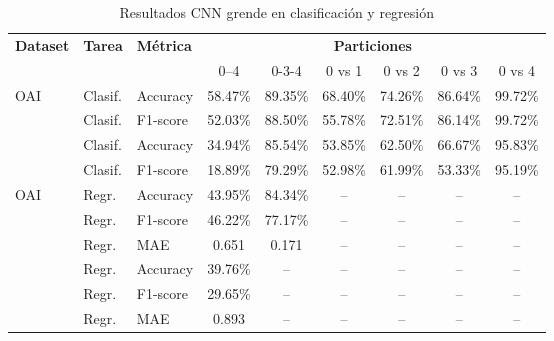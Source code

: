 \documentclass[11pt,spanish,listoffigures,listoftables]{tfgetsinf}
\begin{document}
\begin{table}[h]
    \centering
    \caption{Resultados CNN grende en clasificación y regresión}
    \label{tab:cnn_grande_results}
    \begin{tabular}{@{} l l l c c c c c c @{}} 
      \toprule
      \textbf{Dataset} & \textbf{Tarea} & \textbf{Métrica} 
        & \multicolumn{6}{c}{\textbf{Particiones}} \\
      \cmidrule(lr){4-9}
      & & & 0--4 & 0-3-4 & 0 vs 1 & 0 vs 2 & 0 vs 3 & 0 vs 4 \\
      \midrule
      \multirow{2}{*}{OAI}
        & Clasif. & Accuracy   & 58.47\% & 89.35\% & 68.40\% & 74.26\% & 86.64\% & 99.72\% \\
        & Clasif. & F1-score   & 52.03\% & 88.50\% & 55.78\% & 72.51\% & 86.14\% & 99.72\% \\
      \addlinespace
      \multirow{2}{*}{Gatos}
        & Clasif. & Accuracy   & 34.94\% & 85.54\% & 53.85\% & 62.50\% & 66.67\% & 95.83\% \\
        & Clasif. & F1-score   & 18.89\% & 79.29\% & 52.98\% & 61.99\% & 53.33\% & 95.19\% \\
      \midrule
      \multirow{3}{*}{OAI}
        & Regr.   & Accuracy   & 43.95\% & 84.34\% & -- & -- & -- & -- \\
        & Regr.   & F1-score   & 46.22\% & 77.17\% & -- & -- & -- & -- \\
        & Regr.   & MAE        & 0.651 & 0.171 & -- & -- & -- & -- \\
      \addlinespace
      \multirow{3}{*}{Gatos}
        & Regr.   & Accuracy   & 39.76\% & -- & -- & -- & -- & -- \\
        & Regr.   & F1-score   & 29.65\% & -- & -- & -- & -- & -- \\
        & Regr.   & MAE        & 0.893 & -- & -- & -- & -- & -- \\
      \bottomrule
    \end{tabular}
\end{table}
\end{document}
